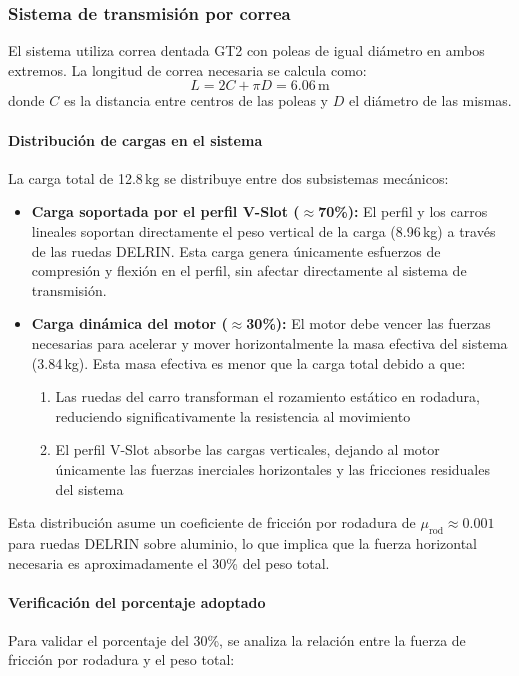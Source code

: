 \subsubsection{Sistema de transmisión por correa}
El sistema utiliza correa dentada GT2 con poleas de igual diámetro en ambos extremos. La longitud de correa necesaria se calcula como:
\begin{equation}
L = 2C + \pi D = 6.06\,\text{m}
\label{eq:longitud_correa}
\end{equation}
donde $C$ es la distancia entre centros de las poleas y $D$ el diámetro de las mismas.

\paragraph{Distribución de cargas en el sistema}
La carga total de 12.8\,kg se distribuye entre dos subsistemas mecánicos:

\begin{itemize}
    \item \textbf{Carga soportada por el perfil V-Slot ($\approx$70\%):} El perfil y los carros lineales soportan directamente el peso vertical de la carga (8.96\,kg) a través de las ruedas DELRIN. Esta carga genera únicamente esfuerzos de compresión y flexión en el perfil, sin afectar directamente al sistema de transmisión.
    
    \item \textbf{Carga dinámica del motor ($\approx$30\%):} El motor debe vencer las fuerzas necesarias para acelerar y mover horizontalmente la masa efectiva del sistema (3.84\,kg). Esta masa efectiva es menor que la carga total debido a que:
    \begin{enumerate}
        \item Las ruedas del carro transforman el rozamiento estático en rodadura, reduciendo significativamente la resistencia al movimiento
        \item El perfil V-Slot absorbe las cargas verticales, dejando al motor únicamente las fuerzas inerciales horizontales y las fricciones residuales del sistema
    \end{enumerate}
\end{itemize}

Esta distribución asume un coeficiente de fricción por rodadura de $\mu_{\text{rod}} \approx 0.001$ para ruedas DELRIN sobre aluminio, lo que implica que la fuerza horizontal necesaria es aproximadamente el 30\% del peso total.

\paragraph{Verificación del porcentaje adoptado}
Para validar el porcentaje del 30\%, se analiza la relación entre la fuerza de fricción por rodadura y el peso total:

